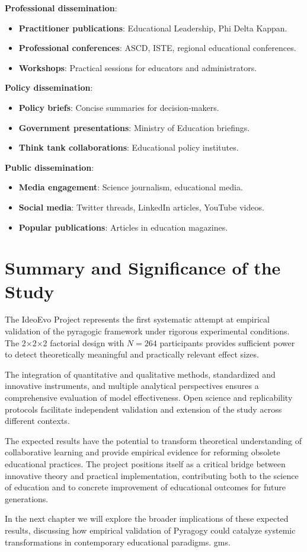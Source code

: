 \textbf{Professional dissemination}:
\begin{itemize}
	\item \textbf{Practitioner publications}: Educational Leadership, Phi Delta Kappan.
	\item \textbf{Professional conferences}: ASCD, ISTE, regional educational conferences.
	\item \textbf{Workshops}: Practical sessions for educators and administrators.
\end{itemize}

\textbf{Policy dissemination}:
\begin{itemize}
	\item \textbf{Policy briefs}: Concise summaries for decision-makers.
	\item \textbf{Government presentations}: Ministry of Education briefings.
	\item \textbf{Think tank collaborations}: Educational policy institutes.
\end{itemize}

\textbf{Public dissemination}:
\begin{itemize}
	\item \textbf{Media engagement}: Science journalism, educational media.
	\item \textbf{Social media}: Twitter threads, LinkedIn articles, YouTube videos.
	\item \textbf{Popular publications}: Articles in education magazines.
\end{itemize}

\newpage

\section{Summary and Significance of the Study}

The IdeoEvo Project represents the first systematic attempt at empirical validation of the pyragogic framework under rigorous experimental conditions. The 2×2×2 factorial design with $N=264$ participants provides sufficient power to detect theoretically meaningful and practically relevant effect sizes.

The integration of quantitative and qualitative methods, standardized and innovative instruments, and multiple analytical perspectives ensures a comprehensive evaluation of model effectiveness. Open science and replicability protocols facilitate independent validation and extension of the study across different contexts.

The expected results have the potential to transform theoretical understanding of collaborative learning and provide empirical evidence for reforming obsolete educational practices. The project positions itself as a critical bridge between innovative theory and practical implementation, contributing both to the science of education and to concrete improvement of educational outcomes for future generations.

In the next chapter we will explore the broader implications of these expected results, discussing how empirical validation of Pyragogy could catalyze systemic transformations in contemporary educational paradigms.
gms.